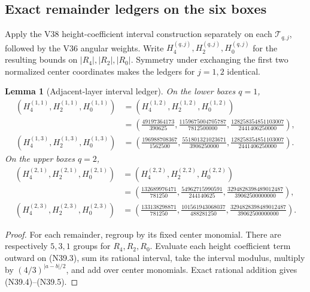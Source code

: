 \documentclass[11pt]{article}
\newtheorem{lemma}[theorem]{Lemma}
\theoremstyle{definition}
\theoremstyle{remark}
\begin{document}
\subsection{Exact remainder ledgers on the six boxes}

Apply the V38 height-coefficient interval construction separately on each
\(\mathcal T_{q,j}\), followed by the V36 angular weights.  Write
\(H^{(q,j)}_4,H^{(q,j)}_2,H^{(q,j)}_0\) for the resulting bounds on
\(|R_4|,|R_2|,|R_0|\).  Symmetry under exchanging the first two normalized
center coordinates makes the ledgers for \(j=1,2\) identical.

\begin{lemma}[Adjacent-layer interval ledger]
\label{lem:f2v39-ledger}
On the lower boxes \(q=1\),
\[
\begin{aligned}
 (H^{(1,1)}_4,H^{(1,1)}_2,H^{(1,1)}_0)
 &=(H^{(1,2)}_4,H^{(1,2)}_2,H^{(1,2)}_0)\\
 &=\left(
 \frac{49197364173}{390625},
 \frac{1159675004705787}{7812500000},
 \frac{128258354851103007}{2441406250000}
 \right),\\
 (H^{(1,3)}_4,H^{(1,3)}_2,H^{(1,3)}_0)
 &=\left(
 \frac{196988708367}{1562500},
 \frac{551801321023671}{3906250000},
 \frac{128258354851103007}{2441406250000}
 \right).
\end{aligned}
\tag{N39.4}
\]
On the upper boxes \(q=2\),
\[
\begin{aligned}
 (H^{(2,1)}_4,H^{(2,1)}_2,H^{(2,1)}_0)
 &=(H^{(2,2)}_4,H^{(2,2)}_2,H^{(2,2)}_0)\\
 &=\left(
 \frac{132689976471}{781250},
 \frac{54962715990591}{244140625},
 \frac{3294828398489012487}{39062500000000}
 \right),\\
 (H^{(2,3)}_4,H^{(2,3)}_2,H^{(2,3)}_0)
 &=\left(
 \frac{133138298871}{781250},
 \frac{101561943068037}{488281250},
 \frac{3294828398489012487}{39062500000000}
 \right).
\end{aligned}
\tag{N39.5}
\]
\end{lemma}

\begin{proof}
For each remainder, regroup by its fixed center monomial.  There are
respectively \(5,3,1\) groups for \(R_4,R_2,R_0\).  Evaluate each height
coefficient term outward on \textup{(N39.3)}, sum its rational interval,
take the interval modulus, multiply by
\((4/3)^{|a-b|/2}\), and add over center monomials.  Exact rational
addition gives \textup{(N39.4)}--\textup{(N39.5)}.
\end{proof}
\end{document}
